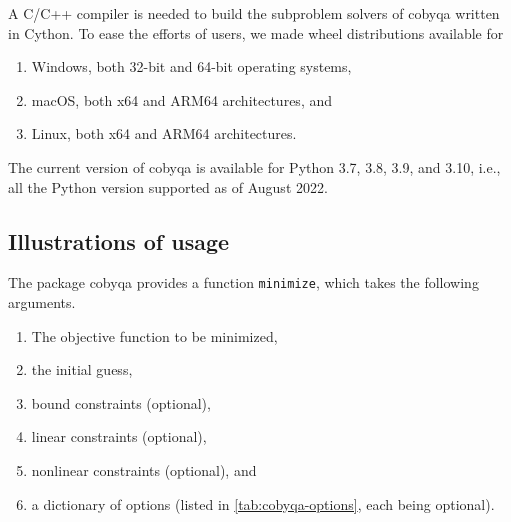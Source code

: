 A C/C++ compiler is needed to build the subproblem solvers of \gls{cobyqa} written in Cython.
To ease the efforts of users, we made wheel distributions available for
\begin{enumerate}
    \item Windows, both 32-bit and 64-bit operating systems,
    \item macOS, both x64 and ARM64 architectures, and
    \item Linux, both x64 and ARM64 architectures.
\end{enumerate}
The current version of \gls{cobyqa} is available for Python 3.7, 3.8, 3.9, and 3.10, i.e., all the Python version supported as of August 2022.

\subsection{Illustrations of usage}

The package \gls{cobyqa} provides a function \texttt{minimize}, which takes the following arguments.
\begin{enumerate}
    \item The objective function to be minimized,
    \item the initial guess,
    \item bound constraints (optional),
    \item linear constraints (optional),
    \item nonlinear constraints (optional), and
    \item a dictionary of options (listed in \cref{tab:cobyqa-options}, each being optional).
\end{enumerate}

